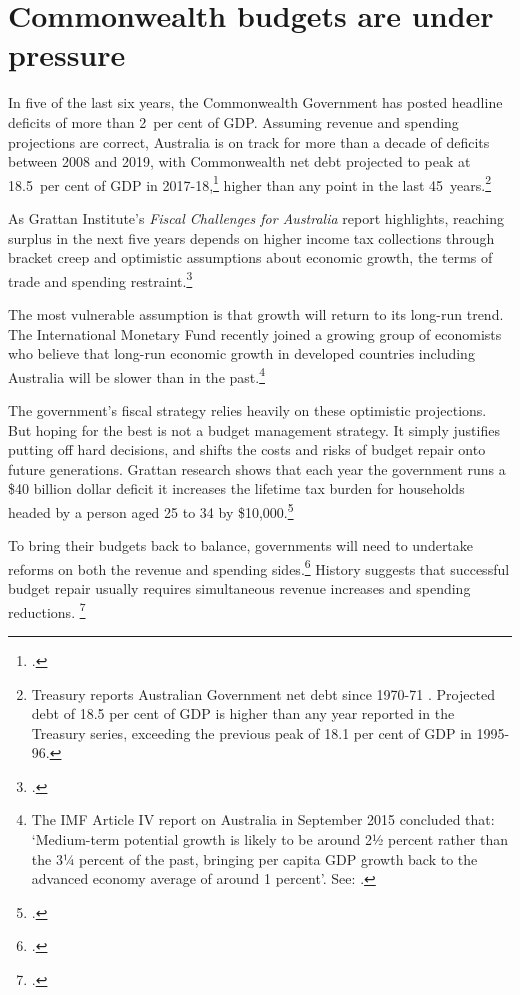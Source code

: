 \documentclass{grattanAlpha}\usepackage[]{graphicx}\usepackage[]{color}
\begin{document}
\chapter{Commonwealth budgets are under pressure}
In five of the last six years, the Commonwealth Government has posted headline deficits of more than 2~per cent of GDP.
Assuming revenue and spending projections are correct, Australia is on track for more than a decade of deficits between 2008 and 2019, with Commonwealth net debt projected to peak at 18.5~per cent of GDP in 2017-18,\footcite[][1]{Treasury2015c} higher than any point in the last 45~years.\footnote{Treasury reports Australian Government net debt since 1970-71 \textcite[273]{Treasury2014b}. Projected debt of 18.5 per cent of GDP is higher than any year reported in the Treasury series, exceeding the previous peak of 18.1 per cent of GDP in 1995-96.}
 
As Grattan Institute's \emph{Fiscal Challenges for Australia} report highlights, reaching surplus in the next five years depends on higher income tax collections through bracket creep and optimistic assumptions about economic growth, the terms of trade and spending restraint.\footcite{DaleyWood2015FiscalChallenges} 
 
The most vulnerable assumption is that growth will return to its long-run trend. The International Monetary Fund recently joined a growing group of economists who believe that long-run economic growth in developed countries including Australia will be slower than in the past.\footnote{The IMF Article IV report on Australia in September 2015 concluded that: ‘Medium-term potential growth is likely to be around 2½ percent rather than the 3¼ percent of the past, bringing per capita GDP growth back to the advanced economy average of around 1 percent’. See: \textcite[][11]{IMF2015b}.}
 
 
The government’s fiscal strategy relies heavily on these optimistic projections. But hoping for the best is not a budget management strategy. It simply justifies putting off hard decisions, and shifts the costs and risks of budget repair onto future generations. Grattan research shows that each year the government runs a \$40 billion dollar deficit it increases the lifetime tax burden for households headed by a person aged 25 to 34 by \$10,000.\footcite[][9]{DaleyWoodWeidmannEtAl2014}
 
To bring their budgets back to balance, governments will need to undertake reforms on both the revenue and spending sides.\footcite[][1]{DaleyWood2015FiscalChallenges}  History suggests that successful budget repair usually requires simultaneous revenue increases and spending reductions. \footcite[][16]{Daley2013}
 
\end{document}
